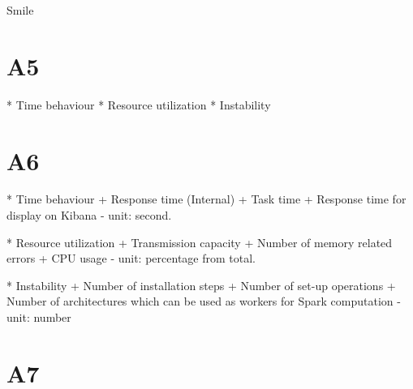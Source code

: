 
  Smile


\section{A5}
  * Time behaviour
  * Resource utilization
  * Instability

\section{A6}
  * Time behaviour
    + Response time (Internal)
    + Task time
    + Response time for display on Kibana - unit: second.

  * Resource utilization
      + Transmission capacity
      + Number of memory related errors
      + CPU usage - unit: percentage from total.

  * Instability
      + Number of installation steps
      + Number of set-up operations
      + Number of architectures which can be used as workers for Spark computation - unit: number

\section{A7}
